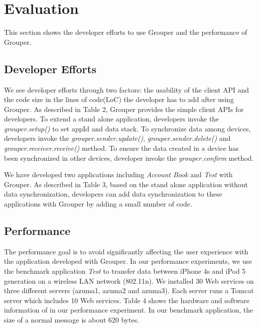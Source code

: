 \documentclass[twocolumn,10pt]{article}
\begin{document}
\section{Evaluation}

This section shows the developer efforts to use Grouper and the performance of Grouper.

\subsection{Developer Efforts}

We see developer efforts through two factors: the usability of the client API and the code size in the lines of code(LoC) the developer has to add after using Grouper. 
As described in Table 2, Grouper provides the simple client APIs for developers.
To extend a stand alone application, developers invoke the \emph{grouper.setup()} to set appId and data stack.
To synchronize data among devices, developers invoke the \emph{grouper.sender.update()}, \emph{grouper.sender.delete()} and \emph{grouper.receiver.receive()} method.
To ensure the data created in a device has been synchronized in other devices, developer invoke the \emph{grouper.confirm} method.

We have developed two applications including \emph{Account Book} and \emph{Test} with Grouper. 
As described in Table 3, based on the stand alone application without data synchronization, developers can add data synchronization to these applications with Grouper by adding a small number of code. 

\subsection{Performance}

The performance goal is to avoid significantly affecting the user experience with the application developed with Grouper. 
In our performance experiments, we use the benchmark application \emph{Test} to transfer data between iPhone 4s and iPod 5 generation on a wireless LAN network (802.11n).
We installed 30 Web services on three different servers (azuma1, azuma2 and azuma3).
Each server runs a Tomcat server which includes 10 Web services.
Table 4 shows the hardware and software information of in our performance experiment.
In our benchmark application, the size of a normal message is about 620 bytes.
\end{document}
